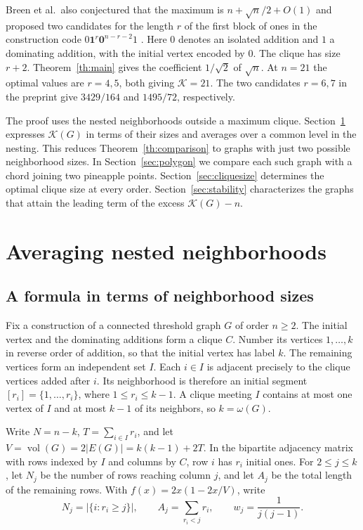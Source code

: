 \documentclass[11pt]{amsart}
\numberwithin{equation}{section}
\newcommand{\K}{\mathcal K}
\DeclareMathOperator{\vol}{vol}
\begin{document}
Breen et al.\ also conjectured that the maximum is
$n+\sqrt n/2+O(1)$ and proposed two candidates for the length $r$ of
the first block of ones in the construction code
$0\mathbf 1^r\mathbf 0^{n-r-2}1$
\cite[Proposition 3.15 and Conjecture 3.16]{Breen}.
Here $0$ denotes an isolated addition and $1$ a dominating addition,
with the initial vertex encoded by $0$. The clique has size $r+2$.
Theorem~\ref{th:main} gives the coefficient $1/\sqrt2$ of $\sqrt n$.
At $n=21$ the optimal values are $r=4,5$, both giving
$\K=21$. The two candidates $r=6,7$ in the preprint give
$3429/164$ and $1495/72$, respectively.

The proof uses the nested neighborhoods outside a maximum clique.
Section~\ref{sec:averaging} expresses $\K(G)$ in terms of their
sizes and averages over a common level in the nesting. This reduces
Theorem~\ref{th:comparison} to graphs with just two possible
neighborhood sizes. In Section~\ref{sec:polygon} we compare each
such graph with a chord joining two pineapple points.
Section~\ref{sec:cliquesize} determines the optimal clique size at
every order. Section~\ref{sec:stability} characterizes the graphs
that attain the leading term of the excess $\K(G)-n$.

\section{Averaging nested neighborhoods}\label{sec:averaging}

\subsection{A formula in terms of neighborhood sizes}
Fix a construction of a connected threshold graph $G$ of order $n\ge2$.
The initial vertex and the dominating additions form a clique $C$.
Number its vertices $1,\ldots,k$ in reverse order of addition, so
that the initial vertex has label $k$. The remaining vertices form
an independent set $I$. Each $i\in I$ is adjacent precisely to the
clique vertices added after $i$. Its neighborhood is therefore an
initial segment $[r_i]=\{1,\ldots,r_i\}$, where $1\le r_i\le k-1$.
A clique meeting $I$ contains at most one vertex of $I$ and at most
$k-1$ of its neighbors, so $k=\omega(G)$.

Write $N=n-k$, $T=\sum_{i\in I}r_i$, and let
$V=\vol(G)=2|E(G)|=k(k-1)+2T$. In the bipartite adjacency matrix
with rows indexed by $I$ and columns by $C$, row $i$ has $r_i$
initial ones. For $2\le j\le k$, let $N_j$ be the number of rows
reaching column $j$, and let $A_j$ be the total length of the
remaining rows. With $f(x)=2x(1-2x/V)$, write
\[
 N_j=|\{i:r_i\ge j\}|,\qquad A_j=\sum_{r_i<j}r_i,
 \qquad w_j=\frac1{j(j-1)}.
\]
\end{document}
